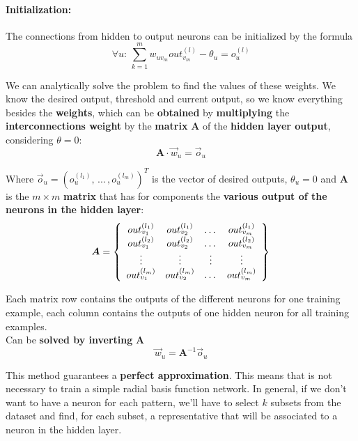 \newpage

\paragraph{Initialization:} The connections from hidden to output neurons can be initialized by the formula
$$ \forall u: \, \sum_{k=1}^m w_{uv_m} out_{v_m}^{(l)} - \theta_u = o_u^{(l)} $$

We can analytically solve the problem to find the values of these weights. We know the desired output, threshold and current output, so we know everything besides the \textbf{weights}, which can be \textbf{obtained} by \textbf{multiplying} the \textbf{interconnections weight} by the \textbf{matrix} $\bm{A}$ of the \textbf{hidden layer output}, considering $\theta = 0$:
$$ \bm{A} \cdot \vec{w}_u = \vec{o}_u $$

Where $\vec{o}_u = \left(o_u^{(l_1)}, \, ... \, , o_u^{(l_m)}\right)^T$ is the vector of desired outputs, $\theta_u = 0$ and $\bm{A}$ is the $m \times m$ \textbf{matrix} that has for components the \textbf{various output of the neurons in the hidden layer}:
$$ \bm{A} = \left\{
\begin{array}{c c c c}
	out_{v_1}^{(l_1)} & out_{v_2}^{(l_1)} & \dots & out_{v_m}^{(l_1)} \\
	out_{v_1}^{(l_2)} & out_{v_2}^{(l_2)} & \dots & out_{v_m}^{(l_2)} \\
	\vdots & \vdots & \vdots & \vdots \\
	out_{v_1}^{(l_m)} & out_{v_2}^{(l_m)} & \dots & out_{v_m}^{(l_m)} \\
\end{array}
\right\}$$

Each matrix row contains the outputs of the different neurons for one training example, each column contains the outputs of one hidden neuron for all training examples.\\

Can be \textbf{solved by inverting} $\bm{A}$
$$ \vec{w}_u = \bm{A}^{-1} \vec{o}_u $$

This method guarantees a \textbf{perfect approximation}. This means that is not necessary to train a simple radial basis function network. In general, if we don't want to have a neuron for each pattern, we'll have to select $k$ subsets from the dataset and find, for each subset, a representative that will be associated to a neuron in the hidden layer. \\

\newpage

